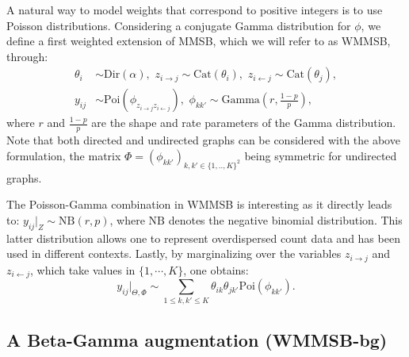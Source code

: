 A natural way to model weights that correspond to positive integers is to use Poisson distributions. Considering a conjugate Gamma distribution for $\phi$, we define a first weighted extension of MMSB, which we will refer to as WMMSB, through:
%
\begin{align*} \label{eq:generative}
\theta_i & \sim \textrm{Dir}(\alpha), \,\, z_{i\rightarrow j} \sim \textrm{Cat}(\theta_i), \,\, z_{i\leftarrow j} \sim \textrm{Cat}(\theta_j), \\
y_{ij} &\sim \textrm{Poi}(\phi_{z_{i \rightarrow j}z_{i \leftarrow j}}), \,\, \phi_{kk'} \sim \textrm{Gamma}(r, \frac{1-p}{p}),
\end{align*}
%
where $r$ and $\frac{1-p}{p}$ are the shape and rate parameters of the Gamma distribution. Note that both directed and undirected graphs can be considered with the above formulation, the matrix $\Phi = (\phi_{kk'})_{k,k' \in \{1,..,K\}^2}$ being symmetric for undirected graphs.

The Poisson-Gamma combination in WMMSB is interesting as it directly leads to: $y_{ij}|_{Z} \sim \textrm{NB}(r,p)$, where $\textrm{NB}$ denotes the negative binomial distribution. This latter distribution allows one to represent overdispersed count data and has been used in different contexts.
Lastly, by marginalizing over the variables $z_{i \rightarrow j}$ and $z_{i \leftarrow j}$, which take values in $\{1, \cdots, K\}$, one obtains:
 \begin{equation}\label{eq:PoiCombin}
 y_{ij}|_{\Theta,\Phi} \sim \sum_{1 \le k,k' \le K} \theta_{ik} \theta_{jk'} \textrm{Poi}(\phi_{kk'}).
 \end{equation}
%

\subsection{A Beta-Gamma augmentation (WMMSB-bg)} 

